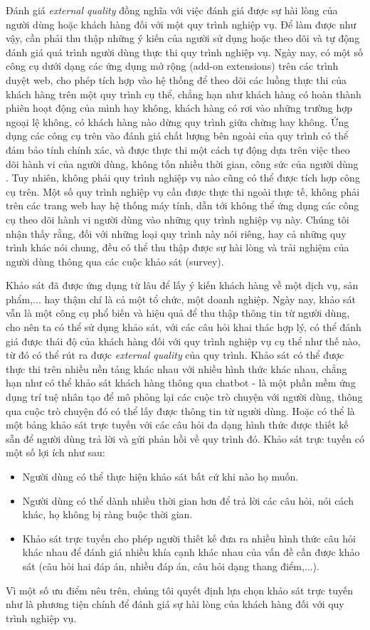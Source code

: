 Đánh giá \emph{external quality} đồng nghĩa với việc đánh giá được sự hài lòng của người dùng hoặc khách hàng đối với một quy trình nghiệp vụ. Để làm được như vậy, cần phải thu thập những ý kiến của người sử dụng hoặc theo dõi và tự động đánh giá quá trình người dùng thực thi quy trình nghiệp vụ. Ngày nay, có một số công cụ dưới dạng các ứng dụng mở rộng (add-on extensions) trên các trình duyệt web, cho phép tích hợp vào hệ thống để theo dõi các luồng thực thi của khách hàng trên một quy trình cụ thể, chẳng hạn như khách hàng có hoàn thành phiên hoạt động của mình hay không, khách hàng có rơi vào những trường hợp ngoại lệ không, có khách hàng nào dừng quy trình giữa chừng hay không.
Ứng dụng các công cụ trên vào đánh giá chất lượng bên ngoài của quy trình có thể đảm bảo tính chính xác, và được thực thi một cách tự động dựa trên việc theo dõi hành vi của người dùng, không tốn nhiều thời gian, công sức của người dùng . Tuy nhiên, không phải quy trình nghiệp vụ nào cũng có thể được tích hợp công cụ trên. Một số quy trình nghiệp vụ cần được thực thi ngoài thực tế, không phải trên các trang web hay hệ thống máy tính, dẫn tới không thể ứng dụng các công cụ theo dõi hành vi người dùng vào những quy trình nghiệp vụ này. Chúng tôi nhận thấy rằng, đối với những loại quy trình này nói riêng, hay cả những quy trình khác nói chung, đều có thể thu thập được sự hài lòng và trải nghiệm của người dùng thông qua các cuộc khảo sát (survey).
\par
Khảo sát đã được ứng dụng từ lâu để lấy ý kiến khách hàng về một dịch vụ, sản phẩm,... hay thậm chí là cả một tổ chức, một doanh nghiệp. Ngày nay, khảo sát vẫn là một công cụ phổ biến và hiệu quả để thu thập thông tin từ người dùng, cho nên ta có thể sử dụng khảo sát, với các câu hỏi khai thác hợp lý, có thể đánh giá được thái độ của khách hàng đối với quy trình nghiệp vụ cụ thể như thế nào, từ đó có thể rút ra được \emph{external quality} của quy trình. Khảo sát có thể được thực thi trên nhiều nền tảng khác nhau với nhiều hình thức khác nhau, chẳng hạn như có thể khảo sát khách hàng thông qua chatbot - là một phần mềm ứng dụng trí tuệ nhân tạo để mô phỏng lại các cuộc trò chuyện với người dùng, thông qua cuộc trò chuyện đó có thể lấy được thông tin từ người dùng. Hoặc có thể là một bảng khảo sát trực tuyến với các câu hỏi đa dạng hình thức được thiết kế sẵn để người dùng trả lời và gửi phản hồi về quy trình đó. Khảo sát trực tuyến có một số lợi ích như sau:
\begin{itemize}
    \item Người dùng có thể thực hiện khảo sát bất cứ khi nào họ muốn.
    \item Người dùng có thể dành nhiều thời gian hơn để trả lời các câu hỏi, nói cách khác, họ không bị ràng buộc thời gian.
    \item Khảo sát trực tuyến cho phép người thiết kế đưa ra nhiều hình thức câu hỏi khác nhau để đánh giá nhiều khía cạnh khác nhau của vấn đề cần được khảo sát (câu hỏi hai đáp án, nhiều đáp án, câu hỏi dạng thang điểm,...).
\end{itemize}
\par
Vì một số ưu điểm nêu trên, chúng tôi quyết định lựa chọn khảo sát trực tuyến như là phương tiện chính để đánh giá sự hài lòng của khách hàng đối với quy trình nghiệp vụ.